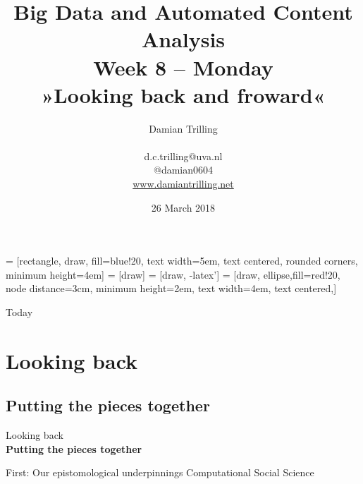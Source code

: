 \documentclass{beamer}
\begin{document}
\title[Big Data and Automated Content Analysis]{\textbf{Big Data and Automated Content Analysis} \\ Week 8 -- Monday \\ »Looking back and froward«}
\author[Damian Trilling]{Damian Trilling \\ ~ \\ \footnotesize{d.c.trilling@uva.nl \\@damian0604} \\ \url{www.damiantrilling.net}}
\date{26 March 2018}




 = [rectangle, draw, fill=blue!20, 
text width=5em, text centered, rounded corners, minimum height=4em]
 = [draw]
 = [draw, -latex']
 = [draw, ellipse,fill=red!20, node distance=3cm,
minimum height=2em, text width=4em, text centered,]

















\begin{frame}{}
\titlepage
\end{frame}

\begin{frame}{Today}
\tableofcontents
\end{frame}




\section{Looking back}
\subsection{Putting the pieces together}
\begin{frame}[plain]{}
Looking back\\
\textbf{Putting the pieces together}
\end{frame}


\begin{frame}{First: Our epistomological underpinnings}
	Computational Social Science
\end{frame}
\end{document}
